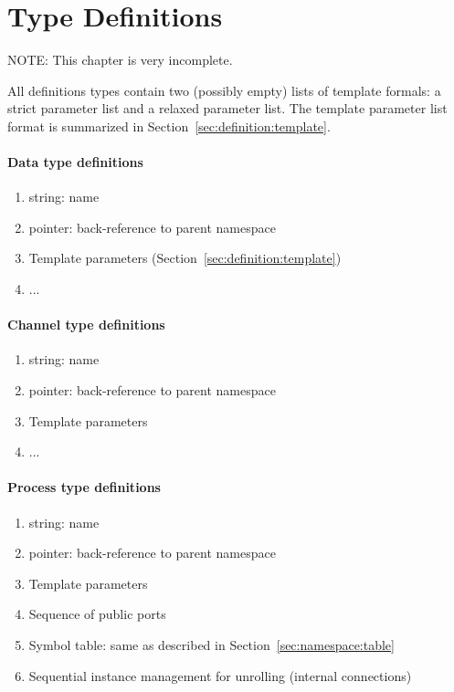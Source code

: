 
\chapter{Type Definitions}
\label{sec:definition}

NOTE: This chapter is very incomplete.  

All definitions types contain two (possibly empty) lists of template
formals: a strict parameter list and a relaxed parameter list.  
The template parameter list format is summarized
in Section~\ref{sec:definition:template}.  

\subsubsection{Data type definitions}

\begin{enumerate}
\item string: name
\item pointer: back-reference to parent namespace
\item Template parameters (Section~\ref{sec:definition:template})
\item ...
\end{enumerate}

\subsubsection{Channel type definitions}
\begin{enumerate}
\item string: name
\item pointer: back-reference to parent namespace
\item Template parameters
\item ...
\end{enumerate}

\subsubsection{Process type definitions}
\begin{enumerate}
\item string: name
\item pointer: back-reference to parent namespace
\item Template parameters
\item Sequence of public ports
\item Symbol table: same as described in Section~\ref{sec:namespace:table}
\item Sequential instance management for unrolling (internal connections)
\end{enumerate}

